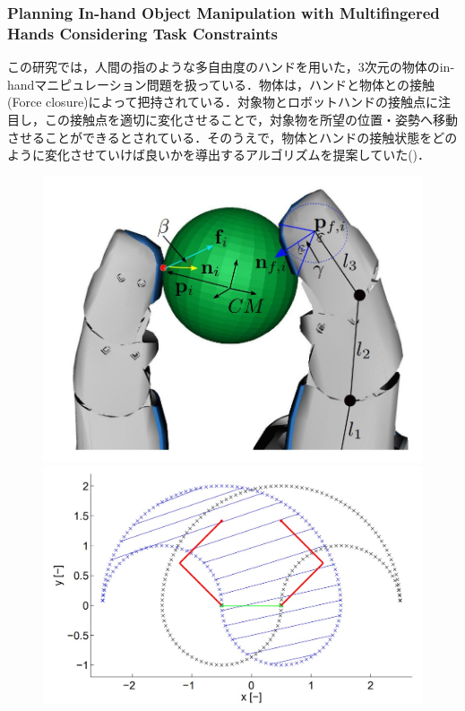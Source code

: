 \documentclass[a4paper,twoside,12pt,papersize, dvipdfmx]{iirthesis}
\begin{document}
\subsubsection{Planning In-hand Object Manipulation with Multifingered Hands Considering Task Constraints \cite{hertkorn2013}}
この研究では，人間の指のような多自由度のハンドを用いた，3次元の物体のin-handマニピュレーション問題を扱っている．物体は，ハンドと物体との接触(Force closure)によって把持されている．対象物とロボットハンドの接触点に注目し，この接触点を適切に変化させることで，対象物を所望の位置・姿勢へ移動させることができるとされている．そのうえで，物体とハンドの接触状態をどのように変化させていけば良いかを導出するアルゴリズムを提案していた()．
\begin{figure}[b]
\begin{minipage}{0.33\hsize}
\includegraphics[width=0.98\hsize]{fig/1-introduction/Hertkorn/fig1.jpg}
\end{minipage}\hfill
\begin{minipage}{0.33\hsize}
\includegraphics[width=0.98\hsize]{fig/1-introduction/Hertkorn/fig2.jpg}

\end{minipage}
\end{figure}
\end{document}
